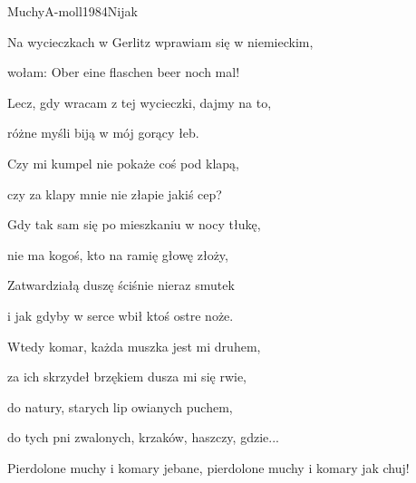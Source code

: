 \documentclass[a4paper,draft]{book}
\begin{document}
\begin{song}{Muchy}{A-moll}{1984}{Nijak}{}{}
\begin{SBVerse}
	Na wycieczkach w Gerlitz wprawiam się w niemieckim,

	wołam: Ober eine flaschen beer noch mal!
	\end{SBVerse}
	\begin{SBVerse}
	Lecz, gdy wracam z tej wycieczki, dajmy na to,

	różne myśli biją w mój gorący łeb.

	Czy mi kumpel nie pokaże coś pod klapą,

	czy za klapy mnie nie złapie jakiś cep?
	\end{SBVerse}
	\begin{SBVerse}
	Gdy tak sam się po mieszkaniu w nocy tłukę,

	nie ma kogoś, kto na ramię głowę złoży,

	Zatwardziałą duszę ściśnie nieraz smutek

	i jak gdyby w serce wbił ktoś ostre noże.
	\end{SBVerse}
	\begin{SBVerse}
	Wtedy komar, każda muszka jest mi druhem,

	za ich skrzydeł brzękiem dusza mi się rwie,

	do natury, starych lip owianych puchem,

	do tych pni zwalonych, krzaków, haszczy, gdzie...
	\end{SBVerse}

	\begin{SBChorus}
	Pierdolone muchy i komary jebane, pierdolone muchy i komary jak chuj!
	\end{SBChorus}
\end{song}
\end{document}
